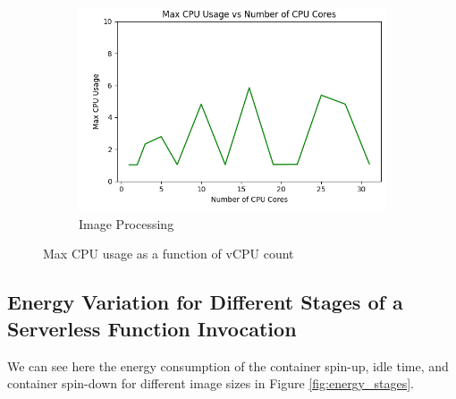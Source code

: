 \documentclass[times, 10pt,twocolumn]{article}
\begin{document}
\begin{figure}[ht]
\begin{subfigure}[b]{0.33\textwidth}
      \includegraphics[width=\textwidth]{imgs/study_1_results/var_cpu/imageprocess/CPU_CPUUsage.png}
     \caption{Image Processing}
     \label{fig:image_max_cpu}
   \end{subfigure}
   \caption{Max CPU usage as a function of vCPU count}
   \label{fig:max_cpu} %
\end{figure}




 \subsection{Energy Variation for Different Stages of a Serverless Function Invocation}
 \label{appendix:energy_variation_vcpu_memory}
 We can see here the energy consumption of the container spin-up, idle time, and container spin-down for different image sizes in Figure \ref{fig:energy_stages}. 
\end{document}

